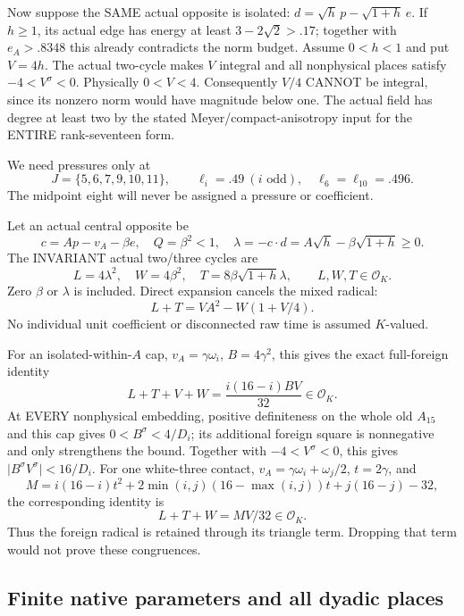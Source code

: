 \documentclass[11pt]{article}
\begin{document}
Now suppose the SAME actual opposite is isolated:
\(d=\sqrt h\,p-\sqrt{1+h}\,e\).
If \(h\ge1\), its actual edge has energy at least
\(3-2\sqrt2>.17\); together with \(e_A>.8348\) this
already contradicts the norm budget.
Assume \(0<h<1\) and put \(V=4h\).
The actual two-cycle makes \(V\) integral and all nonphysical
places satisfy \(-4<V^\sigma<0\).
Physically \(0<V<4\).
Consequently \(V/4\) CANNOT be integral, since its nonzero norm
would have magnitude below one.
The actual field has degree at least two by the stated
Meyer/compact-anisotropy input for the ENTIRE rank-seventeen form.

We need pressures only at
\[
 J=\{5,6,7,9,10,11\},\qquad
 \ell_i=.49\ (i\text{ odd}),\quad
 \ell_6=\ell_{10}=.496 .
\]
The midpoint eight will never be assigned a pressure or coefficient.

Let an actual central opposite be
\[
 c=Ap-v_A-\beta e,\quad Q=\beta^2<1,\quad
 \lambda=-c\cdot d=A\sqrt h-\beta\sqrt{1+h}\ge0.
\]
The INVARIANT actual two/three cycles are
\[
 L=4\lambda^2,\quad W=4\beta^2,\quad
T=8\beta\sqrt{1+h}\lambda,\qquad L,W,T\in\mathcal O_K .
\]
Zero \(\beta\) or \(\lambda\) is included.
Direct expansion cancels the mixed radical:
\[
                  L+T=VA^2-W(1+V/4).
\tag{Rankonecycle}\label{eq:arithrankonecycle}
\]
No individual unit coefficient or disconnected raw time is
assumed \(K\)-valued.

For an isolated-within-\(A\) cap,
\(v_A=\gamma\omega_i\), \(B=4\gamma^2\),
this gives the exact full-foreign identity
\[
              L+T+V+W={\frac{i(16-i)BV}{32}}\in\mathcal O_K.
\tag{A15isocycle}\label{eq:arithA15isocycle}
\]
At EVERY nonphysical embedding, positive definiteness on the
whole old \(A_{15}\) and this cap gives
\(0<B^\sigma<4/D_i\); its additional foreign square is
nonnegative and only strengthens the bound.
Together with \(-4<V^\sigma<0\), this gives
\(\lvert B^\sigma V^\sigma\rvert<16/D_i\).
For one white-three contact,
\(v_A=\gamma\omega_i+\omega_j/2\),
\(t=2\gamma\), and
\[
 M=i(16-i)t^2+2\min(i,j)(16-\max(i,j))t+j(16-j)-32,
\]
the corresponding identity is
\[
                         L+T+W=MV/32\in\mathcal O_K.
\tag{A15whitecycle}\label{eq:arithA15whitecycle}
\]
Thus the foreign radical is retained through its triangle term.
Dropping that term would not prove these congruences.

\subsection{Finite native parameters and all dyadic places}
\label{app:arithA15dyadic}
\end{document}
